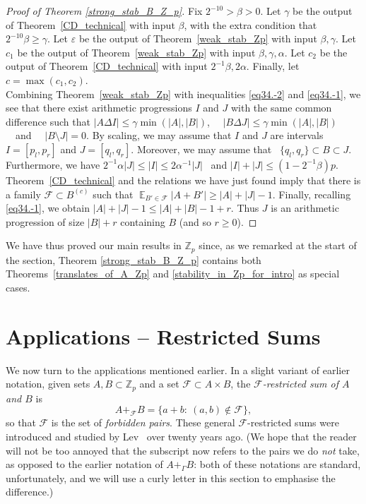 \documentclass[12pt,reqno]{amsart}
\DeclareMathOperator*{\E}{\mathbb{E}}
\theoremstyle{definition}
\renewcommand\leq{\leqslant}
\renewcommand\geq{\geqslant}
\begin{document}
\begin{proof}[Proof of Theorem \ref{strong_stab_B_Z_p}]
  Fix $2^{-10} >\beta>0$. Let $\gamma$ be the output of Theorem~\ref{CD_technical} with input $\beta$, with the
  extra condition that $2^{-10} \beta \geq \gamma$. Let $\varepsilon$ be the output of Theorem~\ref{weak_stab_Zp} with input $\beta,\gamma$. Let $c_1$ be the output of Theorem~\ref{weak_stab_Zp} with input $\beta, \gamma, \alpha$. Let $c_2$ be the output of Theorem~\ref{CD_technical} with input $2^{-1} \beta, 2\alpha$. Finally, let $c=\max(c_1,c_2)$. \\

\vspace{5pt}
Combining Theorem~\ref{weak_stab_Zp} with inequalities \eqref{eq34.-2} and \eqref{eq34.-1}, we see that there exist arithmetic progressions $I$ and $J$ with the same common difference such that
$|A\Delta I| \leq \gamma \min(|A|,|B|)$, \ \ $|B\Delta J| \leq \gamma \min(|A|,|B|)$ \ \ and \ \ $|B\setminus J|=0$.
By scaling, we may assume that $I$ and $J$ are intervals $I=[p_l,p_r]$ and  $J=[q_l,q_r]$.
Moreover, we may assume that \ $\{q_l,q_r\} \subset B \subset J$.
Furthermore, we have
$2^{-1}\alpha |J| \leq |I| \leq 2 \alpha^{-1}|J|$ \  and  $|I|+|J| \leq (1-2^{-1}\beta)p$.
Theorem~\ref{CD_technical} and the relations we have just found imply that
there is a family $\mathcal{F} \subset B^{(c)}$ such that $\E_{B'\in \mathcal{F}}|A+B'|\geq |A|+|J|-1$.
Finally, recalling \eqref{eq34.-1}, we obtain $|A|+|J|-1 \leq |A|+|B|-1+r.$
Thus $J$ is an arithmetic progression of size $|B|+r$ containing $B$ (and so $r \geq 0$).
\end{proof}

\vspace{5pt}
We have thus proved our main results in ${\mathbb Z}_p$ since, as we remarked at the start
of the section, Theorem \ref{strong_stab_B_Z_p} contains both Theorems~\ref{translates_of_A_Zp}
and \ref{stability_in_Zp_for_intro} as special cases.

\section{Applications -- Restricted Sums}

\vspace{5pt}
We now turn to the applications mentioned earlier.
In a slight variant of earlier notation, given sets $A, B \subset {\mathbb Z}_p$ and a set ${\mathcal F} \subset A\times B$, the {\em ${\mathcal F}$-restricted sum of $A$ and $B$} is
\[
A+_{\mathcal F} B=\{a+b: \ (a,b) \not\in {\mathcal F} \},
\]
so that ${\mathcal F}$ is the set of {\em forbidden pairs}. These general ${\mathcal F}$-restricted sums were introduced and studied by Lev~\cite{Lev-00a, Lev-00b, Lev-01} over twenty years ago. (We hope that
the reader will not be too annoyed that the subscript now refers to the pairs we do {\em not} take, as opposed to the earlier notation of $A +_{\Gamma}B$: both of these notations are standard, unfortunately,
and we will use a curly letter in this section to emphasise the difference.)
\end{document}
